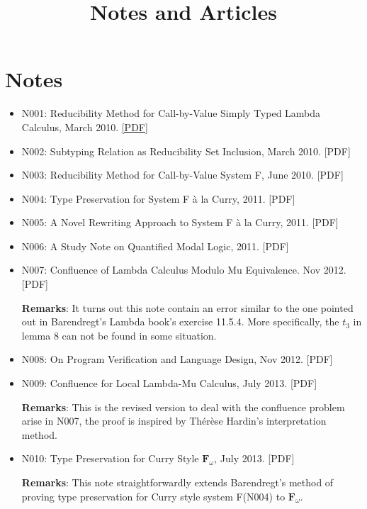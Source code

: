 \documentclass[10pt]{article}
\title{\bfseries\Large Notes and Articles}
\date{}
\begin{document}
\maketitle
\vspace{-4em}

\vspace{20pt}

\section*{Notes}
\begin{itemize}
\item N001: Reducibility Method for Call-by-Value Simply Typed Lambda Calculus, March 2010. \href{here}{[PDF]}

\item N002: Subtyping Relation as Reducibility Set Inclusion, March 2010. [PDF]

\item N003: Reducibility Method for Call-by-Value System F, June 2010. [PDF]

\item N004: Type Preservation for System F \`a la Curry, 2011. [PDF]

\item N005: A Novel Rewriting Approach to System F \`a la Curry, 2011. [PDF]

\item N006: A Study Note on Quantified Modal Logic, 2011. [PDF]

\item N007: Confluence of Lambda Calculus Modulo Mu Equivalence. Nov 2012. [PDF]

\noindent  \textbf{Remarks}: It turns out this note contain an error similar to the one pointed out in Barendregt's Lambda book's exercise 11.5.4. More specifically, the $t_3$ in lemma 8 can not be found in some situation. 

\item N008: On Program Verification and Language Design, Nov 2012. [PDF]

\item N009: Confluence for Local Lambda-Mu Calculus, July 2013. [PDF]

\noindent \textbf{Remarks}: This is the revised version to deal with the confluence problem arise in N007, the proof is inspired by Thérèse Hardin's interpretation method. 

\item N010: Type Preservation for Curry Style $\mathbf{F}_{\omega}$, July 2013. [PDF]

\noindent \textbf{Remarks}: This note straightforwardly extends Barendregt's method of proving type preservation for Curry style system F(N004) to $\mathbf{F}_{\omega}$. 


  
\end{itemize}
\end{document}
